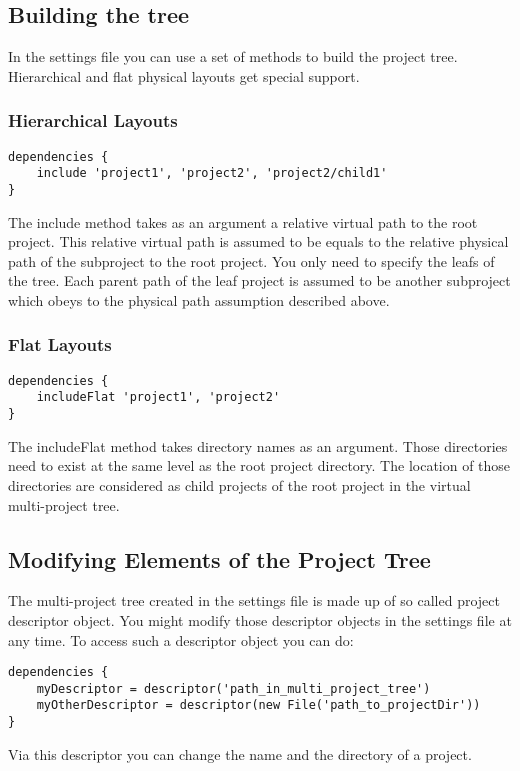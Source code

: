 \subsection{Building the tree} %
\label{sub:building_the_tree}
In the settings file you can use a set of methods to build the project tree. Hierarchical and flat physical layouts get special support. 
\subsubsection{Hierarchical Layouts} %
\label{ssub:hierarchical_layouts}
\begin{Verbatim}
dependencies {
	include 'project1', 'project2', 'project2/child1'
}
\end{Verbatim}
The include method takes as an argument a relative virtual path to the root project. This relative virtual path is assumed to be equals to the relative physical path of the subproject to the root project. You only need to specify the leafs of the tree. Each parent path of the leaf project is assumed to be another subproject which obeys to the physical path assumption described above.
\subsubsection{Flat Layouts} %
\label{ssub:hierarchical_layouts}
\begin{Verbatim}
dependencies {
	includeFlat 'project1', 'project2'
}
\end{Verbatim}
The includeFlat method takes directory names as an argument. Those directories need to exist at the same level as the root project directory. The location of those directories are considered as child projects of the root project in the virtual multi-project tree.

\subsection{Modifying Elements of the Project Tree} %
\label{sub:modifying_element_of_the_project_tree}
The multi-project tree created in the settings file is made up of so called project descriptor object. You might modify those descriptor objects in the settings file at any time. To access such a descriptor object you can do:
\begin{Verbatim}
dependencies {
	myDescriptor = descriptor('path_in_multi_project_tree')
	myOtherDescriptor = descriptor(new File('path_to_projectDir')) 
}
\end{Verbatim}
Via this descriptor you can change the name and the directory of a project.

